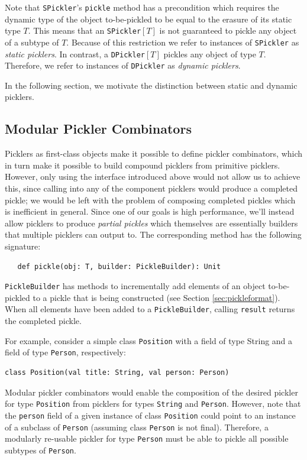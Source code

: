 \documentclass[preprint,10pt]{sigplanconf}
\theoremstyle{definition}
\theoremstyle{definition}
\newcommand{\term}[1]{\mbox{\texttt{#1}}}
\begin{document}
Note that \term{SPickler}'s \term{pickle} method has a precondition which
requires the dynamic type of the object to-be-pickled to be equal to the
erasure of its static type $T$. This means that an \term{SPickler}$[T]$ is not
guaranteed to pickle any object of a subtype of $T$. Because of this
restriction we refer to instances of \term{SPickler} as {\em static picklers}.
In contrast, a \term{DPickler}$[T]$ pickles any object of type $T$. Therefore,
we refer to instances of \term{DPickler} as {\em dynamic picklers}.

In the following section, we motivate the distinction between static and
dynamic picklers.

\subsection{Modular Pickler Combinators}

Picklers as first-class objects make it possible to define pickler
combinators, which in turn make it possible to build compound picklers from
primitive picklers. However, only using the interface introduced above would
not allow us to achieve this, since calling into any of the component picklers
would produce a completed pickle; we would be left with the problem of
composing completed pickles which is inefficient in general. Since one of our
goals is high performance, we'll instead allow picklers to produce {\em
partial pickles} which themselves are essentially builders \cite{Gamma1995}
that multiple picklers can output to. The corresponding method has the
following signature:

\begin{lstlisting}
   def pickle(obj: T, builder: PickleBuilder): Unit
\end{lstlisting}

\verb|PickleBuilder| has methods to incrementally add elements of an object
to-be-pickled to a pickle that is being constructed (see Section
\ref{sec:pickleformat}). When all elements have been added to a
\verb|PickleBuilder|, calling \verb|result| returns the completed pickle.

For example, consider a simple class \verb|Position| with a field of type
String and a field of type \term{Person}, respectively:

\begin{lstlisting}
class Position(val title: String, val person: Person)
\end{lstlisting}

Modular pickler combinators would enable the composition of the desired
pickler for type \term{Position} from picklers for types \term{String} and
\term{Person}. However, note that the \term{person} field of a given instance
of class \term{Position} could point to an instance of a subclass of
\term{Person} (assuming class \term{Person} is not final). Therefore, a
modularly re-usable pickler for type \term{Person} must be able to pickle all
possible subtypes of \term{Person}.
\end{document}
